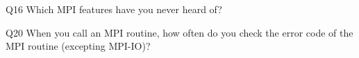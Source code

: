 \begin{description}%
\item{Q16} Which MPI features have you never heard of?%
\item{Q20} When you call an MPI routine, how often do you check the error code of the MPI routine  (excepting MPI-IO)?%
\end{description}%
